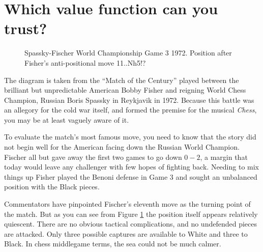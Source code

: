 \section{Which value function can you trust?}


\begin{figure}
\begin{center}
\newgame
{}
\showboard
\caption{Spassky-Fischer World Championship Game 3 1972. Position after Fisher's anti-positional move 11..Nh5!?}

\label{fig:chess}
\end{center}
\end{figure}

The diagram is taken from the ``Match of the Century'' played between the brilliant but unpredictable American Bobby Fisher and reigning World Chess Champion, Russian Boris Spassky in Reykjavik in 1972. Because this battle was an allegory for the cold war itself, and formed the premise for the musical {\em Chess}, you may be at least vaguely aware of it. 

To evaluate the match's most famous move, you need to know that the story did not begin well for the American facing down the Russian World Champion. Fischer all but gave away the first two games to go down $0-2$, a margin that today would leave any challenger with few hopes of fighting back. Needing to mix things up Fisher played the Benoni defense in Game 3 and sought an unbalanced position with the Black pieces.

Commentators have pinpointed Fischer's eleventh move as the turning point of the match. But as you can see from Figure \ref{fig:chess} the position itself appears relatively quiescent. There are no obvious tactical complications, and no undefended pieces are attacked. Only three possible captures are available to White and three to Black. In chess middlegame terms, the sea could not be much calmer. 


